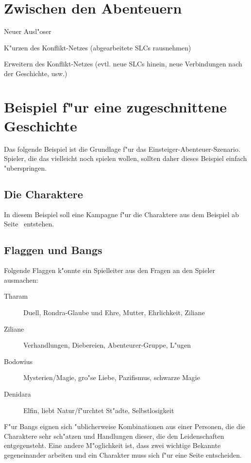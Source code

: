 \section{Zwischen den Abenteuern}

Neuer Ausl"oser

K"urzen des Konflikt-Netzes (abgearbeitete SLCs rausnehmen)

Erweitern des Konflikt-Netzes (evtl. neue SLCs hinein, neue Verbindungen nach der Geschichte, usw.)


\section{Beispiel f"ur eine zugeschnittene Geschichte}
Das folgende Beispiel ist die Grundlage f"ur das Einsteiger-Abenteuer-Szenario. Spieler, die das vielleicht noch spielen wollen, sollten daher dieses Beispiel einfach "uberspringen.



\subsection{Die Charaktere}
In diesem Beispiel soll eine Kampagne f"ur die Charaktere aus dem Beispiel ab Seite~\pageref{BeispielCharaktere} entstehen.



\subsection{Flaggen und Bangs}
Folgende Flaggen k"onnte ein Spielleiter aus den Fragen an den Spieler ausmachen:
\begin{description}
  \item[Tharam] Duell, Rondra-Glaube und Ehre, Mutter, Ehrlichkeit, Ziliane
  \item[Ziliane] Verhandlungen, Diebereien, Abenteurer-Gruppe, L"ugen
  \item[Bodowius] Mysterien/Magie, gro"se Liebe, Pazifismus, schwarze Magie
  \item[Denidara] Elfin, liebt Natur/f"urchtet St"adte, Selbstlosigkeit
\end{description}

F"ur Bangs eignen sich "ublicherweise Kombinationen aus einer Personen, die die Charaktere sehr sch"atzen und Handlungen dieser, die den Leidenschaften entgegensteht. Eine andere M"oglichkeit ist, dass zwei wichtige Bekannte gegeneinander arbeiten und ein Charakter muss sich f"ur eine Seite entscheiden.

